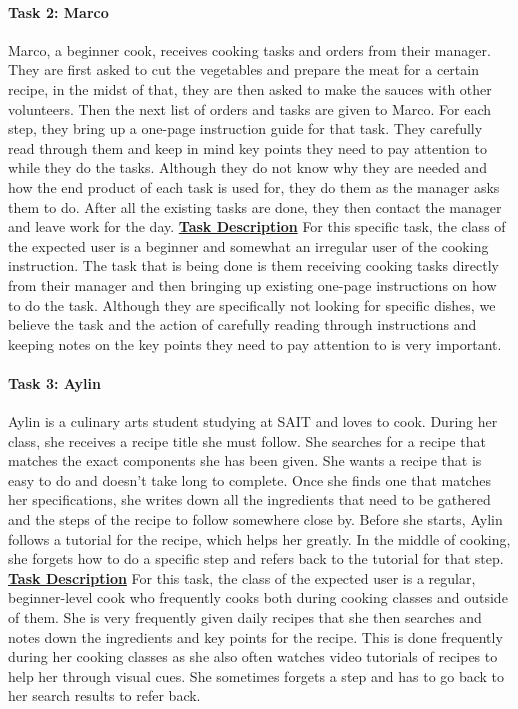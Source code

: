 \documentclass[11pt,english]{article}
\begin{document}
\paragraph{Task 2: Marco}
Marco, a beginner cook, receives cooking tasks and orders from their manager. They are first asked to cut the vegetables and prepare the meat for a certain recipe, in the midst of that, they are then asked to make the sauces with other volunteers. Then the next list of orders and tasks are given to Marco. For each step, they bring up a one-page instruction guide for that task. They carefully read through them and keep in mind key points they need to pay attention to while they do the tasks. Although they do not know why they are needed and how the end product of each task is used for, they do them as the manager asks them to do. After all the existing tasks are done, they then contact the manager and leave work for the day. 
\newline
\newline
\textbf{\underline{Task Description}}
\newline
\newline
For this specific task, the class of the expected user is a beginner and somewhat an irregular user of the cooking instruction. The task that is being done is them receiving cooking tasks directly from their manager and then bringing up existing one-page instructions on how to do the task. Although they are specifically not looking for specific dishes, we believe the task and the action of carefully reading through instructions and keeping notes on the key points they need to pay attention to is very important.
\newline
\paragraph{Task 3: Aylin}
Aylin is a culinary arts student studying at SAIT and loves to cook. During her class, she receives a recipe title she must follow. She searches for a recipe that matches the exact components she has been given. She wants a recipe that is easy to do and doesn’t take long to complete. Once she finds one that matches her specifications, she writes down all the ingredients that need to be gathered and the steps of the recipe to follow somewhere close by. Before she starts, Aylin follows a tutorial for the recipe, which helps her greatly. In the middle of cooking, she forgets how to do a specific step and refers back to the tutorial for that step.
\newline
\newline
\textbf{\underline{Task Description}}
\newline
\newline
For this task, the class of the expected user is a regular, beginner-level cook who frequently cooks both during cooking classes and outside of them. She is very frequently given daily recipes that she then searches and notes down the ingredients and key points for the recipe. This is done frequently during her cooking classes as she also often watches video tutorials of recipes to help her through visual cues. She sometimes forgets a step and has to go back to her search results to refer back.
\newline
\end{document}
